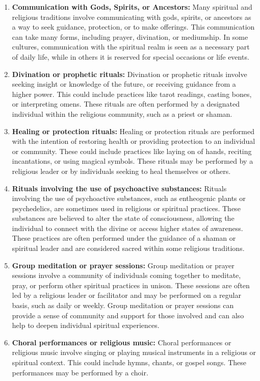\documentclass[12pt]{book}  %
\begin{document}
\begin{enumerate}
    \item \textbf{Communication with Gods, Spirits, or Ancestors:}
    Many spiritual and religious traditions involve communicating with gods, spirits, or ancestors as a way to seek guidance, protection, or to make offerings. This communication can take many forms, including prayer, divination, or mediumship. In some cultures, communication with the spiritual realm is seen as a necessary part of daily life, while in others it is reserved for special occasions or life events.

    \item \textbf{Divination or prophetic rituals:}
    Divination or prophetic rituals involve seeking insight or knowledge of the future, or receiving guidance from a higher power. This could include practices like tarot readings, casting bones, or interpreting omens. These rituals are often performed by a designated individual within the religious community, such as a priest or shaman.
    
    \item \textbf{Healing or protection rituals:}
    Healing or protection rituals are performed with the intention of restoring health or providing protection to an individual or community. These could include practices like laying on of hands, reciting incantations, or using magical symbols. These rituals may be performed by a religious leader or by individuals seeking to heal themselves or others.

    \item \textbf{Rituals involving the use of psychoactive substances:}
    Rituals involving the use of psychoactive substances, such as entheogenic plants or psychedelics, are sometimes used in religious or spiritual practices. These substances are believed to alter the state of consciousness, allowing the individual to connect with the divine or access higher states of awareness. These practices are often performed under the guidance of a shaman or spiritual leader and are considered sacred within some religious traditions.

    \item \textbf{Group meditation or prayer sessions:}
    Group meditation or prayer sessions involve a community of individuals coming together to meditate, pray, or perform other spiritual practices in unison. These sessions are often led by a religious leader or facilitator and may be performed on a regular basis, such as daily or weekly. Group meditation or prayer sessions can provide a sense of community and support for those involved and can also help to deepen individual spiritual experiences.
    
    \item \textbf{Choral performances or religious music:}
    Choral performances or religious music involve singing or playing musical instruments in a religious or spiritual context. This could include hymns, chants, or gospel songs. These performances may be performed by a choir.
    
\end{enumerate}
\end{document}

